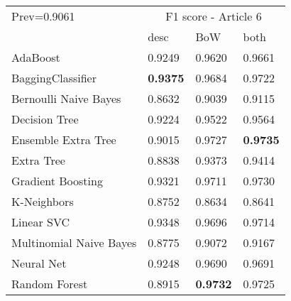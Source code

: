 \begin{tabular}{|l|l|l|l| }
\hline
Prev=0.9061 &  \multicolumn{3}{c|}{F1 score - Article 6} \\
\cline{2-4} & desc & BoW & both \\ \hline
AdaBoost                & 0.9249 & 0.9620 & 0.9661\\
BaggingClassifier       & {\bf 0.9375} & 0.9684 & 0.9722\\
Bernoulli Naive Bayes   & 0.8632 & 0.9039 & 0.9115\\
Decision Tree           & 0.9224 & 0.9522 & 0.9564\\
Ensemble Extra Tree     & 0.9015 & 0.9727 & {\bf 0.9735}\\
Extra Tree              & 0.8838 & 0.9373 & 0.9414\\
Gradient Boosting       & 0.9321 & 0.9711 & 0.9730\\
K-Neighbors             & 0.8752 & 0.8634 & 0.8641\\
Linear SVC              & 0.9348 & 0.9696 & 0.9714\\
Multinomial Naive Bayes & 0.8775 & 0.9072 & 0.9167\\
Neural Net              & 0.9248 & 0.9690 & 0.9691\\
Random Forest           & 0.8915 & {\bf 0.9732} & 0.9725\\
\hline
\end{tabular}